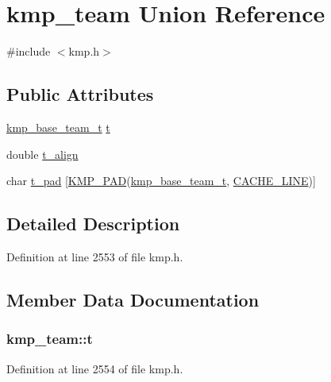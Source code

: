 \hypertarget{unionkmp__team}{\section{kmp\-\_\-team Union Reference}
\label{unionkmp__team}
}


{\ttfamily \#include $<$kmp.\-h$>$}

\subsection*{Public Attributes}
\begin{DoxyCompactItemize}
\item 
\hyperlink{kmp_8h_a9f26c9bb8a280bc3563a7b0afe120c1f}{kmp\-\_\-base\-\_\-team\-\_\-t} \hyperlink{unionkmp__team_a87cf4571108a61b446e809094f8c0362}{t}
\item 
double \hyperlink{unionkmp__team_a09ac6c7b4da00a15b684fbabf2dea4ff}{t\-\_\-align}
\item 
char \hyperlink{unionkmp__team_afcf8e203e79dacf92fdb96af967044c0}{t\-\_\-pad} \mbox{[}\hyperlink{kmp__lock_8h_a7e782410115489f45ab1686c39a2bb89}{K\-M\-P\-\_\-\-P\-A\-D}(\hyperlink{kmp_8h_a9f26c9bb8a280bc3563a7b0afe120c1f}{kmp\-\_\-base\-\_\-team\-\_\-t}, \hyperlink{kmp__os_8h_a86194c659a2d795e5f5949d293ae4661}{C\-A\-C\-H\-E\-\_\-\-L\-I\-N\-E})\mbox{]}
\end{DoxyCompactItemize}


\subsection{Detailed Description}


Definition at line 2553 of file kmp.\-h.



\subsection{Member Data Documentation}
\hypertarget{unionkmp__team_a87cf4571108a61b446e809094f8c0362}{
\subsubsection[{t}]{ kmp\-\_\-team\-::t}}\label{unionkmp__team_a87cf4571108a61b446e809094f8c0362}


Definition at line 2554 of file kmp.\-h.



